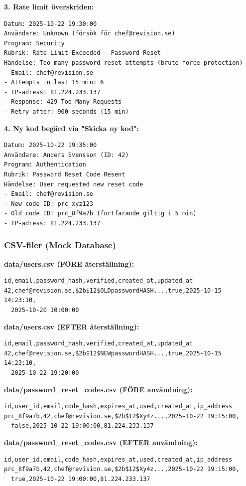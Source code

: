 \documentclass[12pt,a4paper]{article}
\begin{document}
\textbf{3. Rate limit överskriden:}
\begin{verbatim}
Datum: 2025-10-22 19:30:00
Användare: Unknown (försök för chef@revision.se)
Program: Security
Rubrik: Rate Limit Exceeded - Password Reset
Händelse: Too many password reset attempts (brute force protection)
- Email: chef@revision.se
- Attempts in last 15 min: 6
- IP-adress: 81.224.233.137
- Response: 429 Too Many Requests
- Retry after: 900 seconds (15 min)
\end{verbatim}

\textbf{4. Ny kod begärd via "Skicka ny kod":}
\begin{verbatim}
Datum: 2025-10-22 19:35:00
Användare: Anders Svensson (ID: 42)
Program: Authentication
Rubrik: Password Reset Code Resent
Händelse: User requested new reset code
- Email: chef@revision.se
- New code ID: prc_xyz123
- Old code ID: prc_8f9a7b (fortfarande giltig i 5 min)
- IP-adress: 81.224.233.137
\end{verbatim}

\subsubsection{CSV-filer (Mock Database)}

\textbf{data/users.csv (FÖRE återställning):}
\begin{verbatim}
id,email,password_hash,verified,created_at,updated_at
42,chef@revision.se,$2b$12$OLDpasswordHASH...,true,2025-10-15 14:23:10,
  2025-10-20 10:00:00
\end{verbatim}

\textbf{data/users.csv (EFTER återställning):}
\begin{verbatim}
id,email,password_hash,verified,created_at,updated_at
42,chef@revision.se,$2b$12$NEWpasswordHASH...,true,2025-10-15 14:23:10,
  2025-10-22 19:20:00
\end{verbatim}

\textbf{data/password\_reset\_codes.csv (FÖRE användning):}
\begin{verbatim}
id,user_id,email,code_hash,expires_at,used,created_at,ip_address
prc_8f9a7b,42,chef@revision.se,$2b$12$Xy4z...,2025-10-22 19:15:00,
  false,2025-10-22 19:00:00,81.224.233.137
\end{verbatim}

\textbf{data/password\_reset\_codes.csv (EFTER användning):}
\begin{verbatim}
id,user_id,email,code_hash,expires_at,used,created_at,ip_address
prc_8f9a7b,42,chef@revision.se,$2b$12$Xy4z...,2025-10-22 19:15:00,
  true,2025-10-22 19:00:00,81.224.233.137
\end{verbatim}
\end{document}
